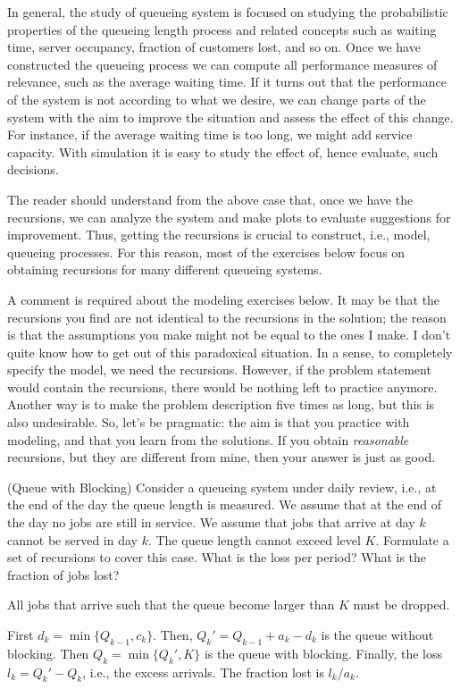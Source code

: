 In general, the study of queueing system is focused on
studying the probabilistic properties of the queueing length process
and related concepts such as waiting time, server occupancy, fraction
of customers lost, and so on. Once we have constructed the queueing
process we can compute all performance measures of relevance, such as
the average waiting time. If it turns out that the
performance of the system is not according to what we desire, we can
change parts of the system with the aim to improve the situation and
assess the effect of this change.  For instance, if the average
waiting time is too long, we might add service capacity. With simulation it is easy to study the effect of, hence
evaluate, such decisions.

The reader should understand from the above case that, once we have
the recursions, we can analyze the system and make plots to evaluate
suggestions for improvement.  Thus, getting the recursions is crucial
to construct, i.e., model, queueing processes. For this reason, most
of the exercises below focus on obtaining recursions for many
different queueing systems. 

\begin{remark}
A comment is required about the modeling exercises below. It may be
that the recursions you find are not identical to the recursions in
the solution; the reason is that the assumptions you make might not be
equal to the ones I make. I don't quite know how to get out of this
paradoxical situation.  In a sense, to completely specify the model,
we need the recursions. However, if the problem statement would
contain the recursions, there would be nothing left to practice
anymore. Another way is to make the problem description five times as
long, but this is also undesirable. So, let's be pragmatic: the aim is
that you practice with modeling, and that you learn from the
solutions.  If you obtain \emph{reasonable} recursions, but they are
different from mine, then your answer is just as good.
\end{remark}

\begin{exercise} (Queue with Blocking) Consider a queueing system
  under daily review, i.e., at the end of the day the queue length is
  measured. We assume that at the end of the day no jobs are still in
  service. We assume that jobs that arrive at day $k$ cannot be served
  in day $k$. The queue length cannot exceed level $K$.  Formulate a
  set of recursions to cover this case. What is the loss per period? What is the fraction of jobs lost?
  \begin{solution}

    All jobs that arrive such that the queue become larger than $K$
    must be dropped. 

First $d_k = \min\{Q_{k-1}, c_k\}$. Then, $Q_k' = Q_{k-1}+a_k-d_k$ is the queue without blocking. Then $Q_k=\min\{Q_k', K\}$ is the queue with blocking. Finally, the loss $l_k=Q_k'-Q_k$, i.e., the excess arrivals. The fraction lost is $l_k/a_k$. 
  \end{solution}
\end{exercise}

